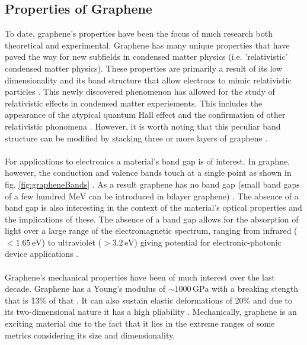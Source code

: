 \documentclass[%
 reprint,
 amsmath,amssymb,
 aps,
pra,
floatfix,
]{revtex4-1}
\begin{document}
\subsection{\label{subsec:properties_graphene} Properties of Graphene}
To date, graphene's properties have been the focus of much research both theoretical and experimental. Graphene has many unique properties that have paved the way for new subfields in condensed matter physics (i.e. 'relativistic' condensed matter physics). These properties are primarily a result of its low dimensionality and its band structure that allow electrons to mimic relativistic particles \cite{Giem2007}. This newly discovered phenomenon has allowed for the study of relativistic effects in condensed matter experiements. This includes the appearance of the atypical quantum Hall effect and the confirmation of other relativistic phonomena \cite{Geim2005_quantum, Zhang2011, Williams2007}. However, it is worth noting that this peculiar band structure can be modified by stacking three or more layers of graphene \cite{nanoscaleReview2011}. 
\\ \\
For applications to electronics a material's band gap is of interest. In graphne, however, the conduction and valence bands touch at a single point as shown in fig. \ref{fig:grapheneBands} \cite{Wallace1947, nanoscaleReview2011}. As a result graphene has no band gap (small band gaps of a few hundred $\textrm{MeV}$ can be introduced in bilayer graphene) \cite{grapheneLike2Dreview2013}. The absence of a band gap is also interesting in the context of the material's optical properties and the implications of these. The absence of a band gap allows for the absorption of light over a large range of the electromagnetic spectrum, ranging from infrared ($< 1.65 \mathrm{\,eV}$) to ultraviolet ($> 3.2 \mathrm{\,eV}$) giving potential for electronic-photonic device applications \cite{Wang2008, Geim2011, Xia2009}.  
\\ \\
Graphene's mechanical properties have been of much interest over the last decade. Graphene has a Young's modulus of $\sim 1000 \mathrm{\,GPa}$ with a breaking stength that is 13\% of that \cite{Bertolazzi2011, 2DflexibleNanoElectronics2014}. It can also sustain elastic deformations of 20\% and due to its two-dimensional nature it has a high pliability \cite{nanoscaleReview2011}. Mechanically, graphene is an exciting material due to the fact that it lies in the extreme ranges of some metrics considering its size and dimensionality. 
\end{document}

